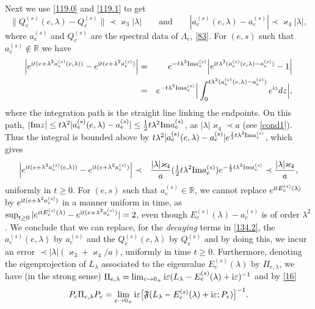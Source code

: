 \documentclass[letterpaper,onecolumn,11pt,accepted=2021-12-09]{quantumarticle}
\numberwithin{equation}{section}
\newcommand{\aes}{a_e^{(s)}}
\newcommand{\Qes}{Q_e^{(s)}}
\newcommand{\Ees}{E_e^{(s)}(\lambda)}
\renewcommand{\i}{{\rm i}}
\begin{document}
Next we use \eqref{119.0} and \eqref{119.1} to get 
\begin{equation}
\|\Qes(e,\lambda) -\Qes\|\prec \varkappa_3|\lambda| \qquad \mbox{and}\qquad |\aes(e,\lambda) - \aes|\prec\varkappa_4|\lambda|, 
\label{74.1}
\end{equation} 
where $\aes$ and $\Qes$ are the spectral data of $\Lambda_e$, \eqref{83}. For $(e,s)$ such that $\aes\notin{\mathbb R}$  we have
\begin{eqnarray}
\Big| e^{\i t(e+\lambda^2 \aes(e,\lambda))} - e^{\i t(e+\lambda^2 \aes)}\Big| &=& e^{-t\lambda^2{\rm Im}\aes} \Big| e^{ \i t\lambda^2 (\aes(e,\lambda)- \aes)} -1\Big|\nonumber\\
&=& e^{-t\lambda^2{\rm Im}\aes} \Big| \int_0^{t\lambda^2(\aes(e,\lambda)- \aes)} e^{\i  z} dz \Big|,
\label{74}
\end{eqnarray}
where the integration path is the straight line linking the endpoints. On this path, $|{\rm Im}z|\le t\lambda^2|\aes(e,\lambda)-\aes|\le \tfrac12 t\lambda^2 {\rm Im}\aes$, as $|\lambda|\varkappa_4\prec a$ (see \eqref{cond1}).  Thus the integral is bounded above by $t\lambda^2|\aes(e,\lambda)-\aes| e^{\frac12 t\lambda^2 {\rm Im}\aes}$, which gives
\begin{eqnarray}
\Big| e^{\i t(e+\lambda^2 \aes(e,\lambda))} - e^{\i t(e+\lambda^2 \aes)}\Big| &\prec & \frac{|\lambda|\varkappa_4}{a} (\tfrac12 t \lambda^2{\rm Im}\aes) e^{-\frac12 t\lambda^2{\rm Im}\aes} \prec \frac{|\lambda|\varkappa_4}{a},
\label{75.1}
\end{eqnarray}
uniformly in $t\ge 0$. For $(e,s)$ such that $\aes\in\mathbb R$, we cannot replace $e^{\i t\Ees}$ by $e^{\i t (e+\lambda^2\aes)}$ in a manner uniform in time, as $\sup_{t\ge 0}|e^{i t\Ees}- e^{\i t (e+\lambda^2\aes)}|=2$, even though $\Ees-\aes$ is of order $\lambda^2$. We conclude that we can replace, for the {\em decaying} terms in \eqref{134.2}, the $\aes(e,\lambda)$ by $\aes$ and the  $\Qes(e,\lambda)$ by $\Qes$ and by doing this, we incur an error $\prec |\lambda| (\varkappa_3+\varkappa_4/a)$, uniformly in time $t\ge 0$. Furthermore, denoting the eigenprojection of $L_\lambda$ associated to the eigenvalue $\Ees$ by $\Pi_{e,\lambda}$, we have (in the strong sense) $\Pi_{e,\lambda} = \lim_{\varepsilon\rightarrow 0_+}\i \varepsilon (L_\lambda -E_e^{(s)}(\lambda)+\i\varepsilon)^{-1}$ and by \eqref{16}
\begin{equation}
P_e \Pi_{e,\lambda}P_e = \lim_{\varepsilon\rightarrow 0_+}\i \varepsilon \big[{\mathfrak F}(L_\lambda -E_e^{(s)}(\lambda)+\i\varepsilon; P_e)\big]^{-1}.
\label{163}
\end{equation}
\end{document}
